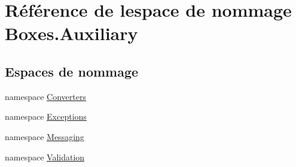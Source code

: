 \hypertarget{namespace_boxes_1_1_auxiliary}{}\section{Référence de l\textquotesingle{}espace de nommage Boxes.\+Auxiliary}
\label{namespace_boxes_1_1_auxiliary}
\subsection*{Espaces de nommage}
\begin{DoxyCompactItemize}
\item 
namespace \hyperlink{namespace_boxes_1_1_auxiliary_1_1_converters}{Converters}
\item 
namespace \hyperlink{namespace_boxes_1_1_auxiliary_1_1_exceptions}{Exceptions}
\item 
namespace \hyperlink{namespace_boxes_1_1_auxiliary_1_1_messaging}{Messaging}
\item 
namespace \hyperlink{namespace_boxes_1_1_auxiliary_1_1_validation}{Validation}
\end{DoxyCompactItemize}
